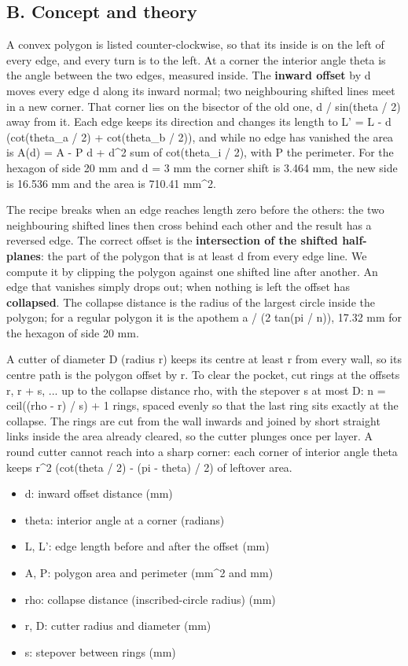 \documentclass[11pt,a4paper]{article}
\begin{document}
\subsection*{B. Concept and theory}
A convex polygon is listed counter-clockwise, so that its inside is on the left of every edge, and every turn is to the left. At a corner the interior angle theta is the angle between the two edges, measured inside. The \textbf{inward offset} by d moves every edge d along its inward normal; two neighbouring shifted lines meet in a new corner. That corner lies on the bisector of the old one, d / sin(theta / 2) away from it. Each edge keeps its direction and changes its length to L' = L - d (cot(theta\_a / 2) + cot(theta\_b / 2)), and while no edge has vanished the area is A(d) = A - P d + d\textasciicircum{}2 sum of cot(theta\_i / 2), with P the perimeter. For the hexagon of side 20 mm and d = 3 mm the corner shift is 3.464 mm, the new side is 16.536 mm and the area is 710.41 mm\textasciicircum{}2.

The recipe breaks when an edge reaches length zero before the others: the two neighbouring shifted lines then cross behind each other and the result has a reversed edge. The correct offset is the \textbf{intersection of the shifted half-planes}: the part of the polygon that is at least d from every edge line. We compute it by clipping the polygon against one shifted line after another. An edge that vanishes simply drops out; when nothing is left the offset has \textbf{collapsed}. The collapse distance is the radius of the largest circle inside the polygon; for a regular polygon it is the apothem a / (2 tan(pi / n)), 17.32 mm for the hexagon of side 20 mm.

A cutter of diameter D (radius r) keeps its centre at least r from every wall, so its centre path is the polygon offset by r. To clear the pocket, cut rings at the offsets r, r + s, ... up to the collapse distance rho, with the stepover s at most D: n = ceil((rho - r) / s) + 1 rings, spaced evenly so that the last ring sits exactly at the collapse. The rings are cut from the wall inwards and joined by short straight links inside the area already cleared, so the cutter plunges once per layer. A round cutter cannot reach into a sharp corner: each corner of interior angle theta keeps r\textasciicircum{}2 (cot(theta / 2) - (pi - theta) / 2) of leftover area.

\begin{itemize}[nosep]
\item d: inward offset distance (mm)
\item theta: interior angle at a corner (radians)
\item L, L': edge length before and after the offset (mm)
\item A, P: polygon area and perimeter (mm\textasciicircum{}2 and mm)
\item rho: collapse distance (inscribed-circle radius) (mm)
\item r, D: cutter radius and diameter (mm)
\item s: stepover between rings (mm)
\end{itemize}
\end{document}
